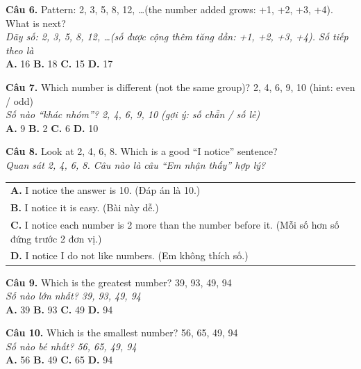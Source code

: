 \documentclass[11pt,a4paper]{article}
\begin{document}
\textbf{Câu 6.} Pattern: 2, 3, 5, 8, 12, \ldots (the number added grows: +1, +2, +3, +4). What is next?\\
\textit{Dãy số: 2, 3, 5, 8, 12, \ldots (số được cộng thêm tăng dần: +1, +2, +3, +4). Số tiếp theo là}\\
\textbf{A.} 16 \quad \textbf{B.} 18 \quad \textbf{C.} 15 \quad \textbf{D.} 17\par\vspace{1.2mm}

\textbf{Câu 7.} Which number is different (not the same group)? 2, 4, 6, 9, 10 (hint: even / odd)\\
\textit{Số nào ``khác nhóm''? 2, 4, 6, 9, 10 (gợi ý: số chẵn / số lẻ)}\\
\textbf{A.} 9 \quad \textbf{B.} 2 \quad \textbf{C.} 6 \quad \textbf{D.} 10\par\vspace{1.2mm}

\textbf{Câu 8.} Look at 2, 4, 6, 8. Which is a good ``I notice'' sentence?\\
\textit{Quan sát 2, 4, 6, 8. Câu nào là câu ``Em nhận thấy'' hợp lý?}\\
\begin{tabular}{@{}l@{}}
\textbf{A.} I notice the answer is 10. (Đáp án là 10.)\\
\textbf{B.} I notice it is easy. (Bài này dễ.)\\
\textbf{C.} I notice each number is 2 more than the number before it. (Mỗi số hơn số đứng trước 2 đơn vị.)\\
\textbf{D.} I notice I do not like numbers. (Em không thích số.)
\end{tabular}\par\vspace{1.2mm}

\textbf{Câu 9.} Which is the greatest number? 39, 93, 49, 94\\
\textit{Số nào lớn nhất? 39, 93, 49, 94}\\
\textbf{A.} 39 \quad \textbf{B.} 93 \quad \textbf{C.} 49 \quad \textbf{D.} 94\par\vspace{1.2mm}

\textbf{Câu 10.} Which is the smallest number? 56, 65, 49, 94\\
\textit{Số nào bé nhất? 56, 65, 49, 94}\\
\textbf{A.} 56 \quad \textbf{B.} 49 \quad \textbf{C.} 65 \quad \textbf{D.} 94\par\vspace{1.2mm}
\end{document}
